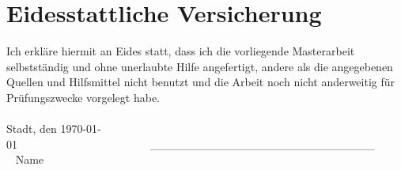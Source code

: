 \chapter*{Eidesstattliche Versicherung}
\thispagestyle{empty}

Ich erkläre hiermit an Eides statt, dass ich die vorliegende Masterarbeit
selbstständig und ohne unerlaubte Hilfe angefertigt, andere als
die angegebenen Quellen und Hilfsmittel nicht benutzt und 
die Arbeit noch nicht anderweitig für Prüfungszwecke vorgelegt habe.\\
\vspace{4\baselineskip}\\
Stadt, den \today~~~~~~~~~~~~~~~~~~~~~~~~\_\_\_\_\_\_\_\_\_\_\_\_\_\_\_\_\_\_\_\_\_\_\_\_\_\_\_\\\
 \hspace*{8cm}  Name 